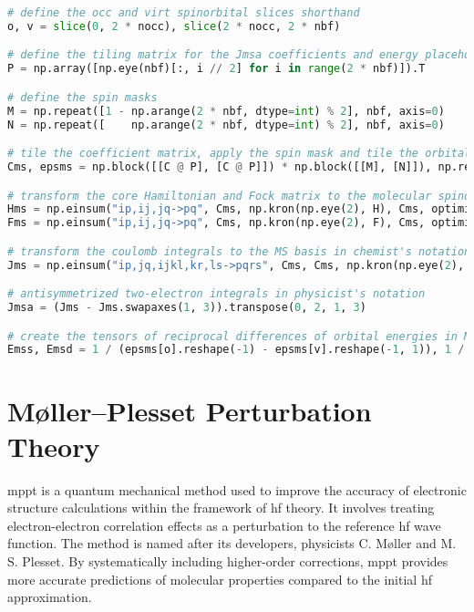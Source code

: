 \raggedbottom\begin{lstlisting}[language=Python, caption={Integral transform exercise code solution.}, label=code:int_solution]
# define the occ and virt spinorbital slices shorthand
o, v = slice(0, 2 * nocc), slice(2 * nocc, 2 * nbf)

# define the tiling matrix for the Jmsa coefficients and energy placeholders
P = np.array([np.eye(nbf)[:, i // 2] for i in range(2 * nbf)]).T

# define the spin masks
M = np.repeat([1 - np.arange(2 * nbf, dtype=int) % 2], nbf, axis=0)
N = np.repeat([    np.arange(2 * nbf, dtype=int) % 2], nbf, axis=0)

# tile the coefficient matrix, apply the spin mask and tile the orbital energies
Cms, epsms = np.block([[C @ P], [C @ P]]) * np.block([[M], [N]]), np.repeat(eps, 2)

# transform the core Hamiltonian and Fock matrix to the molecular spinorbital basis
Hms = np.einsum("ip,ij,jq->pq", Cms, np.kron(np.eye(2), H), Cms, optimize=True)
Fms = np.einsum("ip,ij,jq->pq", Cms, np.kron(np.eye(2), F), Cms, optimize=True)

# transform the coulomb integrals to the MS basis in chemist's notation
Jms = np.einsum("ip,jq,ijkl,kr,ls->pqrs", Cms, Cms, np.kron(np.eye(2), np.kron(np.eye(2), J).T), Cms, Cms, optimize=True);

# antisymmetrized two-electron integrals in physicist's notation
Jmsa = (Jms - Jms.swapaxes(1, 3)).transpose(0, 2, 1, 3)

# create the tensors of reciprocal differences of orbital energies in MS basis used in post-HF methods
Emss, Emsd = 1 / (epsms[o].reshape(-1) - epsms[v].reshape(-1, 1)), 1 / (epsms[o].reshape(-1) + epsms[o].reshape(-1, 1) - epsms[v].reshape(-1, 1, 1) - epsms[v].reshape(-1, 1, 1, 1))
\end{lstlisting}
\chapter{Møller--Plesset Perturbation Theory}

\acrfull{mppt} is a quantum mechanical method used to improve the accuracy of electronic structure calculations within the framework of \acrshort{hf} theory. It involves treating electron-electron correlation effects as a perturbation to the reference \acrshort{hf} wave function. The method is named after its developers, physicists C. Møller and M. S. Plesset. By systematically including higher-order corrections, \acrshort{mppt} provides more accurate predictions of molecular properties compared to the initial \acrshort{hf} approximation.

